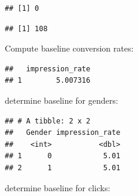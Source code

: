 \documentclass[]{book}
\newenvironment{Shaded}{\begin{snugshade}}{\end{snugshade}}
\newcommand{\DataTypeTok}[1]{\textcolor[rgb]{0.13,0.29,0.53}{#1}}
\newcommand{\KeywordTok}[1]{\textcolor[rgb]{0.13,0.29,0.53}{\textbf{#1}}}
\newcommand{\NormalTok}[1]{#1}
\newcommand{\OperatorTok}[1]{\textcolor[rgb]{0.81,0.36,0.00}{\textbf{#1}}}
\newcommand{\StringTok}[1]{\textcolor[rgb]{0.31,0.60,0.02}{#1}}
\begin{document}
\begin{verbatim}
## [1] 0
\end{verbatim}

\begin{Shaded}
\end{Shaded}

\begin{verbatim}
## [1] 108
\end{verbatim}

Compute baseline conversion rates:

\begin{Shaded}
\end{Shaded}

\begin{verbatim}
##   impression_rate
## 1        5.007316
\end{verbatim}

determine baseline for genders:

\begin{Shaded}
\end{Shaded}

\begin{verbatim}
## # A tibble: 2 x 2
##   Gender impression_rate
##    <int>           <dbl>
## 1      0            5.01
## 2      1            5.01
\end{verbatim}

determine baseline for clicks:

\begin{Shaded}
\end{Shaded}
\end{document}
